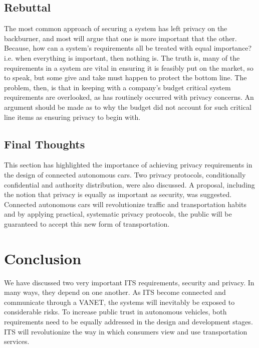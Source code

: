 \documentclass[conference,compsoc]{IEEEtran}
\begin{document}
\subsection{Rebuttal}
The most common approach of securing a system has left privacy on the backburner, and most will argue that one is more important that the other. Because, how can a system’s requirements all be treated with equal importance? i.e. when everything is important, then nothing is. The truth is, many of the requirements in a system are vital in ensuring it is feasibly put on the market, so to speak, but some give and take must happen to protect the bottom line. The problem, then, is that in keeping with a company’s budget critical system requirements are overlooked, as has routinely occurred with privacy concerns. An argument should be made as to why the budget did not account for such critical line items as ensuring privacy to begin with. 
\subsection{Final Thoughts}
This section has highlighted the importance of achieving privacy requirements in the design of connected autonomous cars. Two privacy protocols, conditionally confidential and authority distribution, were also discussed. A proposal, including the notion that privacy is equally as important as security, was suggested. Connected autonomous cars will revolutionize traffic and transportation habits and by applying practical, systematic privacy protocols, the public will be guaranteed to accept this new form of transportation.


\section{Conclusion}
We have discussed two very important ITS requirements, security and privacy. In many ways, they depend on one another. As ITS become connected and communicate through a VANET, the systems will inevitably be exposed to considerable risks. To increase public trust in autonomous vehicles, both requirements need to be equally addressed in the design and development stages. ITS will revolutionize the way in which consumers view and use transportation services. 
\end{document}
